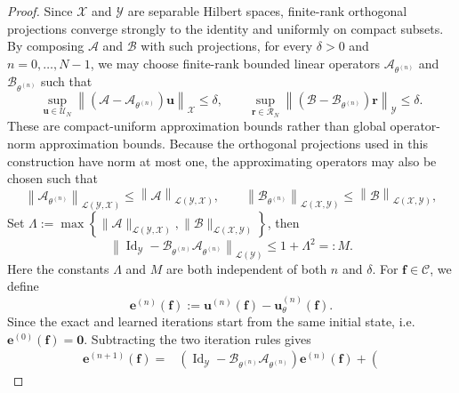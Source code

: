 \documentclass[preprint,numbers,sort&compress]{elsarticle}
\begin{document}
\begin{proof}
				{ Since $\mathcal X$ and $\mathcal Y$ are separable Hilbert spaces,
					finite-rank orthogonal projections converge strongly to the identity and
					uniformly on compact subsets. By composing $\mathcal A$ and $\mathcal B$
					with such projections, for every $\delta>0$ and
					$n=0,\ldots,N-1$, we may choose finite-rank bounded linear operators
					$\mathcal A_{\theta^{(n)}}$ and
					$\mathcal B_{\theta^{(n)}}$ such that
					\[
					\sup_{\boldsymbol u\in\mathcal U_N}
					\left\|
					\left(
					\mathcal A-\mathcal A_{\theta^{(n)}}
					\right)\boldsymbol u
					\right\|_{\mathcal X}
					\leq\delta, \qquad
					\sup_{\boldsymbol r\in\mathcal R_N}
					\left\|
					\left(
					\mathcal B-\mathcal B_{\theta^{(n)}}
					\right)\boldsymbol r
					\right\|_{\mathcal Y}
					\leq\delta.
					\]
					These are compact-uniform approximation bounds rather than global
					operator-norm approximation bounds. }
				Because the orthogonal projections used in this construction have norm at
				most one, the approximating operators may also be chosen such that
				\[
				\left\|
				\mathcal A_{\theta^{(n)}}
				\right\|_{\mathcal L(\mathcal Y,\mathcal X)}
				\leq \left\|
				\mathcal A
				\right\|_{\mathcal L(\mathcal Y,\mathcal X)},
				\qquad
				\left\|
				\mathcal B_{\theta^{(n)}}
				\right\|_{\mathcal L(\mathcal X,\mathcal Y)}
				\leq \left\|
				\mathcal B
				\right\|_{\mathcal L(\mathcal X,\mathcal Y)},
				\]
				Set $\Lambda
				:=
				\max
				\left\{
				\|\mathcal A\|_{\mathcal L(\mathcal Y,\mathcal X)},
				\|\mathcal B\|_{\mathcal L(\mathcal X,\mathcal Y)}
				\right\}$, 
				then
				\[
				\left\|
				\operatorname{Id}_{\mathcal Y}
				-
				\mathcal B_{\theta^{(n)}}
				\mathcal A_{\theta^{(n)}}
				\right\|_{\mathcal L(\mathcal Y)}
				\leq
				1+\Lambda^2
				=:M.
				\]
				Here the constants $\Lambda$ and $M$ are both independent of
				both $n$ and $\delta$.
				For $\boldsymbol f\in\mathcal C$, we define
				\[
				\boldsymbol e^{(n)}(\boldsymbol f)
				:=
				\boldsymbol u^{(n)}(\boldsymbol f)
				-
				\boldsymbol u_\theta^{(n)}(\boldsymbol f).
				\]
				Since the exact and learned iterations start from the same initial state, i.e. $\boldsymbol e^{(0)}(\boldsymbol f)=\boldsymbol 0$.
				Subtracting the two iteration rules gives
				\[
				\begin{aligned}
					\boldsymbol e^{(n+1)}(\boldsymbol f)
					={}&
					\left(
					\operatorname{Id}_{\mathcal Y}
					-
					\mathcal B_{\theta^{(n)}}
					\mathcal A_{\theta^{(n)}}
					\right)
					\boldsymbol e^{(n)}(\boldsymbol f)+
					\left(

\end{aligned}\]
\end{proof}
\end{document}
